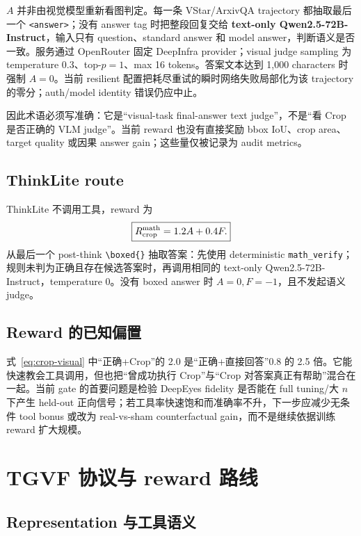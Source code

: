 \documentclass[UTF8,twocolumn,10pt,a4paper]{ctexart}
\newcommand{\code}[1]{\texttt{#1}}
\newcommand{\Rcrop}{R_{\mathrm{crop}}}
\begin{document}
$A$ 并非由视觉模型重新看图判定。每一条 VStar/ArxivQA trajectory 都抽取最后一个 \code{<answer>}；没有 answer tag 时把整段回复交给 \textbf{text-only Qwen2.5-72B-Instruct}，输入只有 question、standard answer 和 model answer，判断语义是否一致。服务通过 OpenRouter 固定 DeepInfra provider；visual judge sampling 为 temperature 0.3、top-$p=1$、max 16 tokens。答案文本达到 1,000 characters 时强制 $A=0$。当前 resilient 配置把耗尽重试的瞬时网络失败局部化为该 trajectory 的零分；auth/model identity 错误仍应中止。

因此术语必须写准确：它是“visual-task final-answer text judge”，不是“看 Crop 是否正确的 VLM judge”。当前 reward 也没有直接奖励 bbox IoU、crop area、target quality 或因果 answer gain；这些量仅被记录为 audit metrics。

\subsection{ThinkLite route}

ThinkLite 不调用工具，reward 为
\begin{equation}
\boxed{\Rcrop^{\rm math}=1.2A+0.4F.}
\label{eq:crop-math}
\end{equation}
从最后一个 post-think \verb|\boxed{}| 抽取答案：先使用 deterministic \code{math\_verify}；规则未判为正确且存在候选答案时，再调用相同的 text-only Qwen2.5-72B-Instruct，temperature 0。没有 boxed answer 时 $A=0,F=-1$，且不发起语义 judge。

\subsection{Reward 的已知偏置}

式~\eqref{eq:crop-visual} 中“正确+Crop”的 2.0 是“正确+直接回答”0.8 的 2.5 倍。它能快速教会工具调用，但也把“曾成功执行 Crop”与“Crop 对答案真正有帮助”混合在一起。当前 gate 的首要问题是检验 DeepEyes fidelity 是否能在 full tuning/大 $n$ 下产生 held-out 正向信号；若工具率快速饱和而准确率不升，下一步应减少无条件 tool bonus 或改为 real-vs-sham counterfactual gain，而不是继续依据训练 reward 扩大规模。

\section{TGVF 协议与 reward 路线}

\subsection{Representation 与工具语义}
\end{document}
